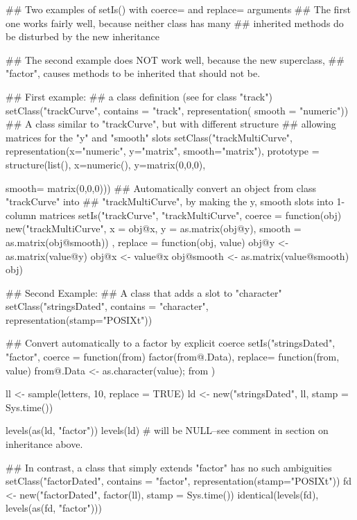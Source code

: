 \begin{Examples}
\begin{ExampleCode}

## Two examples of setIs() with coerce= and replace= arguments
## The first one works fairly well, because neither class has many
## inherited methods do be disturbed by the new inheritance

## The second example does NOT work well, because the new superclass,
## "factor", causes methods to be inherited that should not be.

## First example:
## a class definition (see  for class "track")
setClass("trackCurve", contains = "track",
         representation( smooth = "numeric"))
## A class similar to "trackCurve", but with different structure
## allowing matrices for the "y" and "smooth" slots
setClass("trackMultiCurve",
         representation(x="numeric", y="matrix", smooth="matrix"),
         prototype = structure(list(), x=numeric(), y=matrix(0,0,0),

                               smooth= matrix(0,0,0)))
## Automatically convert an object from class "trackCurve" into
## "trackMultiCurve", by making the y, smooth slots into 1-column matrices
setIs("trackCurve",
      "trackMultiCurve",
      coerce = function(obj) {
        new("trackMultiCurve",
            x = obj@x,
            y = as.matrix(obj@y),
            smooth = as.matrix(obj@smooth))
      },
      replace = function(obj, value) {
        obj@y <- as.matrix(value@y)
        obj@x <- value@x
        obj@smooth <- as.matrix(value@smooth)
        obj})




## Second Example:
## A class that adds a slot to "character"
setClass("stringsDated", contains = "character", representation(stamp="POSIXt"))

## Convert automatically to a factor by explicit coerce
setIs("stringsDated", "factor",
      coerce = function(from) factor(from@.Data),
      replace= function(from, value) {
                  from@.Data <- as.character(value); from })

ll <- sample(letters, 10, replace = TRUE)
ld <- new("stringsDated", ll, stamp = Sys.time())

levels(as(ld, "factor"))
levels(ld) # will be NULL--see comment in section on inheritance above.

## In contrast, a class that simply extends "factor" has no such ambiguities
setClass("factorDated", contains = "factor", representation(stamp="POSIXt"))
fd <- new("factorDated", factor(ll), stamp = Sys.time())
identical(levels(fd), levels(as(fd, "factor")))
\end{ExampleCode}
\end{Examples}
